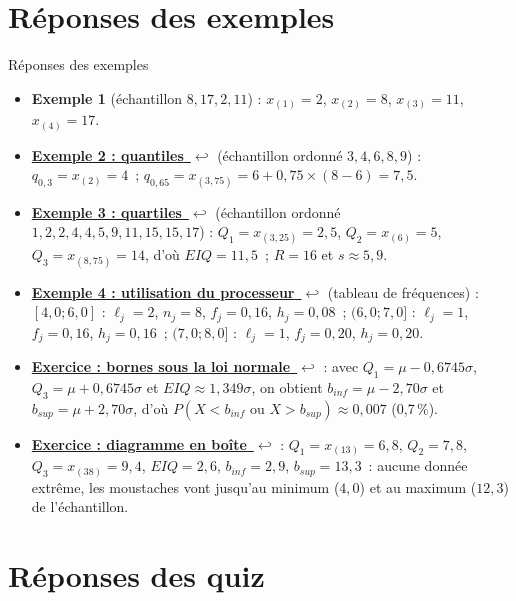 \documentclass{BeamerTemplate}
\newcommand{\retour}[2]{\hyperlink{#1}{\textbf{#2}~{\color{gray}$\hookleftarrow$}}}
\begin{document}
\section{Réponses des exemples}

\begin{frame}[t,label=rep-ex]{Réponses des exemples}
\footnotesize
\begin{itemize}\itemsep3pt
\item \textbf{Exemple 1} (échantillon $8,17,2,11$) : $x_{(1)}=2$, $x_{(2)}=8$, $x_{(3)}=11$, $x_{(4)}=17$.
\item \retour{exquantiles}{Exemple 2 : quantiles} (échantillon ordonné $3,4,6,8,9$) :
$q_{0,3}=x_{(2)}=4$~; $q_{0,65}=x_{(3,75)}=6+0{,}75\times(8-6)=7{,}5$.
\item \retour{exquartiles}{Exemple 3 : quartiles} (échantillon ordonné $1,2,2,4,4,5,9,11,15,15,17$) :
$Q_1=x_{(3,25)}=2{,}5$, $Q_2=x_{(6)}=5$, $Q_3=x_{(8,75)}=14$, d'où $EIQ=11{,}5$~; $R=16$ et $s\approx5{,}9$.
\item \retour{exprocesseur}{Exemple 4 : utilisation du processeur} (tableau de fréquences) : $[4{,}0;6{,}0]$ :
$\ell_j=2$, $n_j=8$, $f_j=0{,}16$, $h_j=0{,}08$~; $(6{,}0;7{,}0]$ : $\ell_j=1$, $f_j=0{,}16$, $h_j=0{,}16$~;
$(7{,}0;8{,}0]$ : $\ell_j=1$, $f_j=0{,}20$, $h_j=0{,}20$.
\item \retour{exbornes}{Exercice : bornes sous la loi normale} : avec $Q_1=\mu-0{,}6745\sigma$,
$Q_3=\mu+0{,}6745\sigma$ et $EIQ\approx1{,}349\sigma$, on obtient $b_{inf}=\mu-2{,}70\sigma$ et
$b_{sup}=\mu+2{,}70\sigma$, d'où $P(X<b_{inf}\text{ ou }X>b_{sup})\approx 0{,}007$ (0,7\,\%).
\item \retour{exboite}{Exercice : diagramme en boîte} : $Q_1=x_{(13)}=6{,}8$, $Q_2=7{,}8$, $Q_3=x_{(38)}=9{,}4$,
$EIQ=2{,}6$, $b_{inf}=2{,}9$, $b_{sup}=13{,}3$~: aucune donnée extrême, les moustaches vont jusqu'au minimum
($4{,}0$) et au maximum ($12{,}3$) de l'échantillon.
\end{itemize}
\end{frame}

\section{Réponses des quiz}
\end{document}
